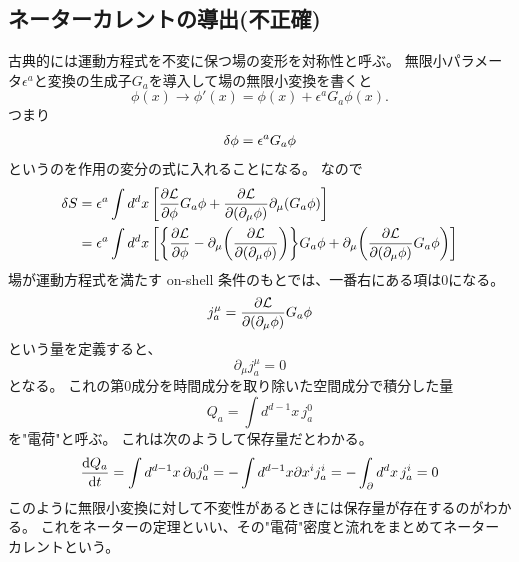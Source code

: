 \documentclass[../../master.tex]{subfiles}
\begin{document}
\subsection*{ネーターカレントの導出(不正確)}
古典的には運動方程式を不変に保つ場の変形を対称性と呼ぶ。
無限小パラメータ\(\epsilon^a\)と変換の生成子\(G_a\)を導入して場の無限小変換を書くと
\begin{equation}
    \phi(x) \rightarrow \phi'(x) = \phi(x) + \epsilon^a G_a \phi(x).
\end{equation}
つまり
\begin{align*}
    \var{\phi}=\epsilon^a G_a \phi
\end{align*}
というのを作用の変分の式に入れることになる。
なので
\begin{align}
    \var{S}
    &= \epsilon^a \int d^d x\, \qty[\pdv{\mathcal{L}}{\phi}G_a\phi+\pdv{\mathcal{L}}{(\partial_\mu \phi)}\partial_\mu (G_a\phi)] \notag\\
    &= \epsilon^a  \int d^d x\, \qty[
            \qty{\pdv{\mathcal{L}}{\phi}
            -\partial_\mu\qty(\pdv{\mathcal{L}}{(\partial_\mu \phi)})}G_a\phi
            +\partial_\mu\qty(\pdv{\mathcal{L}}{(\partial_\mu\phi)}G_a \phi)
        ]
\end{align}
場が運動方程式を満たす on-shell 条件のもとでは、一番右にある項は0になる。
\begin{equation}
    j_a^\mu=\pdv{\mathcal{L}}{(\partial_\mu\phi)}G_a\phi
\end{equation}
という量を定義すると、
\begin{equation}
    \partial_\mu j_a^\mu =0
\end{equation}
となる。
これの第0成分を時間成分を取り除いた空間成分で積分した量
\begin{equation}
    Q_a = \int d^{d-1}x \,j_a^0
\end{equation}
を"電荷"と呼ぶ。
これは次のようして保存量だとわかる。
\begin{equation}
    \dv{Q_a}{t} = \int d^{d-1}x\, \partial_{0}j_a^0 = -\int d^{d-1}x \partial{x^i}j_a^i = -\int_\partial d^dx\,j_a^i =0
\end{equation}
このように無限小変換に対して不変性があるときには保存量が存在するのがわかる。
これをネーターの定理といい、その"電荷"密度と流れをまとめてネーターカレントという。
\end{document}
